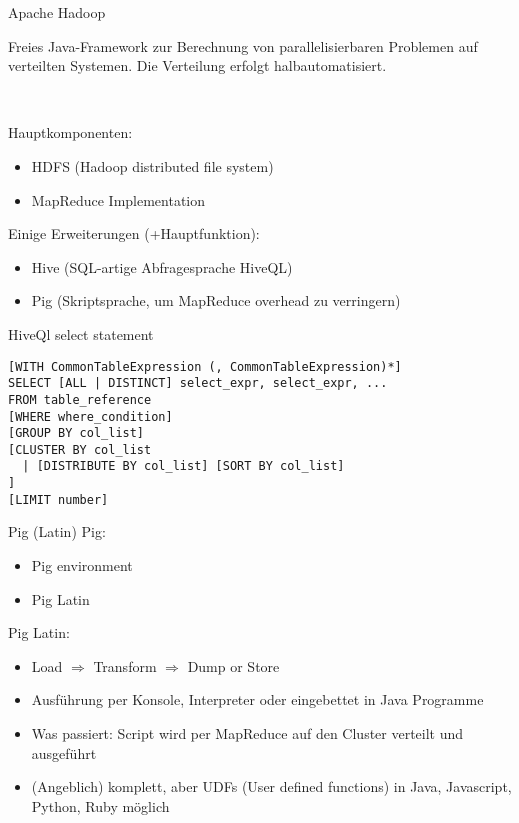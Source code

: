 \documentclass{beamer}
\begin{document}
\begin{frame}{Apache Hadoop}
	\begin{block}{}
		Freies Java-Framework zur Berechnung von parallelisierbaren Problemen auf verteilten Systemen. 
		Die Verteilung erfolgt halbautomatisiert.
	\end{block}		
	\quad \\
	\uncover<2-3> {
	Hauptkomponenten:
	\begin{itemize}
		\item HDFS (Hadoop distributed file system)
		\item MapReduce Implementation
	\end{itemize} 
	}

	 {
	Einige Erweiterungen (+Hauptfunktion):
	\begin{itemize}
		\item Hive (SQL-artige Abfragesprache HiveQL)
		\item Pig (Skriptsprache, um MapReduce overhead zu verringern)
	\end{itemize}
	}
\end{frame}

\begin{frame}[fragile]{HiveQl select statement}
\begin{lstlisting}
[WITH CommonTableExpression (, CommonTableExpression)*]    
SELECT [ALL | DISTINCT] select_expr, select_expr, ...
FROM table_reference
[WHERE where_condition]
[GROUP BY col_list]
[CLUSTER BY col_list
  | [DISTRIBUTE BY col_list] [SORT BY col_list]
]
[LIMIT number]
\end{lstlisting}
\end{frame}

\begin{frame}{Pig (Latin)}
Pig:
\begin{itemize}
	\item Pig environment
	\item Pig Latin
\end{itemize}

Pig Latin:
\begin{itemize}
	\item Load \(\Rightarrow\) Transform \(\Rightarrow\) Dump or Store
	\item Ausführung per Konsole, Interpreter oder eingebettet in Java Programme
	\item Was passiert: Script wird per MapReduce auf den Cluster verteilt und ausgeführt 
	\item (Angeblich) komplett, aber UDFs (User defined functions) in Java, Javascript, Python, Ruby möglich
\end{itemize}
\end{frame}
\end{document}
